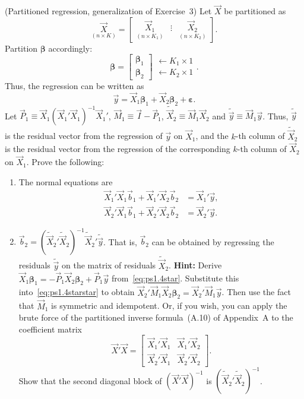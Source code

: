 \begin{problemset}
\exercise[4] (Partitioned regression, generalization of Exercise~3)\quad
Let $\vec{X}$ be partitioned as
%
\[
\underset{(n \times K)}{\vec{X}}
= \begin{bmatrix}
\underset{(n \times K_1)}{\vec{X}_1} & \vdots &
\underset{(n \times K_2)}{\vec{X}_2}
\end{bmatrix}.
\]
%
Partition $\bm{\beta}$ accordingly:
%
\[
\bm{\beta} = \begin{bmatrix} \bm{\beta}_1 \\ \bm{\beta}_2 \end{bmatrix}
\begin{array}{l} \leftarrow K_1 \times 1 \\ \leftarrow K_2 \times 1 \end{array}.
\]
%
Thus, the regression can be written as
%
\[
\vec{y} = \vec{X}_1 \bm{\beta}_1 + \vec{X}_2 \bm{\beta}_2 + \bm{\varepsilon}.
\]
%
Let $\vec{P}_1 \equiv \vec{X}_1(\vec{X}_1'\vec{X}_1)^{-1}\vec{X}_1'$,
$\vec{M}_1 \equiv \vec{I} - \vec{P}_1$,
$\widetilde{\vec{X}}_2 \equiv \vec{M}_1 \vec{X}_2$ and
$\tilde{\vec{y}} \equiv \vec{M}_1 \vec{y}$.
Thus, $\tilde{\vec{y}}$ is the residual vector from the regression of $\vec{y}$
on $\vec{X}_1$, and the $k$-th column of $\widetilde{\vec{X}}_2$ is the residual
vector from the regression of the corresponding $k$-th column of
$\vec{X}_2$ on $\vec{X}_1$. Prove the following:

\begin{enumerate}[label=(\alph*)]
\item The normal equations are
%
\begin{align}
\vec{X}_1'\vec{X}_1 \vec{b}_1 + \vec{X}_1'\vec{X}_2 \vec{b}_2
&= \vec{X}_1'\vec{y}, \tag{$*$} \label{eq:ps1.4star}\\
\vec{X}_2'\vec{X}_1 \vec{b}_1 + \vec{X}_2'\vec{X}_2 \vec{b}_2
&= \vec{X}_2'\vec{y}. \tag{$**$} \label{eq:ps1.4starstar}
\end{align}

\item $\vec{b}_2 = (\widetilde{\vec{X}}_2'\widetilde{\vec{X}}_2)^{-1}
\widetilde{\vec{X}}_2'\tilde{\vec{y}}$.
That is, $\vec{b}_2$ can be obtained by regressing the residuals
$\tilde{\vec{y}}$ on the matrix of residuals $\widetilde{\vec{X}}_2$.
\textbf{Hint:} Derive $\vec{X}_1\bm{\beta}_1 = -\vec{P}_1\vec{X}_2\bm{\beta}_2
+ \vec{P}_1\vec{y}$ from~\eqref{eq:ps1.4star}. Substitute this
into~\eqref{eq:ps1.4starstar} to obtain
$\vec{X}_2'\vec{M}_1\vec{X}_2\bm{\beta}_2 = \vec{X}_2'\vec{M}_1\vec{y}$.
Then use the fact that $\vec{M}_1$ is symmetric and idempotent.
Or, if you wish, you can apply the brute force of the partitioned inverse
formula~(A.10) of Appendix~A to the coefficient matrix
%
\[
\vec{X}'\vec{X} = \begin{bmatrix}
\vec{X}_1'\vec{X}_1 & \vec{X}_1'\vec{X}_2 \\
\vec{X}_2'\vec{X}_1 & \vec{X}_2'\vec{X}_2
\end{bmatrix}.
\]
%
Show that the second diagonal block of $(\vec{X}'\vec{X})^{-1}$ is
$(\widetilde{\vec{X}}_2'\widetilde{\vec{X}}_2)^{-1}$.


\end{enumerate}
\end{problemset}
